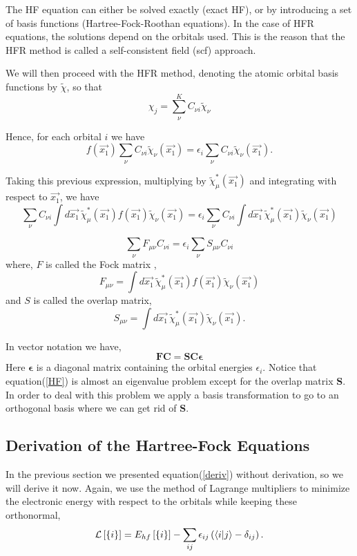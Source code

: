 \documentclass[a4paper]{article}
\begin{document}
The HF equation can either be solved exactly (exact HF), or by introducing a set of basis functions (Hartree-Fock-Roothan equations).
In the case of HFR equations, the solutions depend on the orbitals used.
This is the reason that the HFR method is called a self-consistent field (scf) approach.

We will then proceed with the HFR method, denoting the atomic orbital basis functions by $\tilde{\chi}$, so that
$$
\chi_{j} = \sum^{K}_{\nu} C_{\nu i} \tilde{\chi}_{\nu}
$$

Hence, for each orbital $i$ we have
$$
f(\vec{x_1}) \sum_{\nu} C_{\nu i} \tilde{\chi}_{\nu}(\vec{x_1}) = \epsilon_i \sum_{\nu} C_{\nu i} \tilde{\chi}_{\nu}(\vec{x_1}).
$$

Taking this previous expression, multiplying by $\tilde{\chi}^{*}_{\mu} (\vec{x_1})$ and integrating with respect to $\vec{x_1}$, we have
$$
\sum_\nu C_{\nu i} \int d\vec{x_1} \, \tilde{\chi}^{*}_{\mu}(\vec{x_1}) f(\vec{x_1}) \tilde{\chi}_{\nu}(\vec{x_1}) =
\epsilon_i \sum_\nu C_{\nu i} \int d\vec{x_1} \, \tilde{\chi}^{*}_{\mu}(\vec{x_1}) \tilde{\chi}_{\nu}(\vec{x_1})
$$

$$
\sum_\nu F_{\mu\nu} C_{\nu i} = \epsilon_i \sum_\nu S_{\mu\nu} C_{\nu i}
$$
where, $F$ is called the Fock matrix ,
$$
 F_{\mu\nu} = \int d\vec{x_1} \, \tilde{\chi}^{*}_{\mu}(\vec{x_1}) f(\vec{x_1}) \tilde{\chi}_{\nu}(\vec{x_1})
$$
and $S$ is called the overlap matrix,
$$
S_{\mu\nu} = \int d\vec{x_1} \, \tilde{\chi}^{*}_{\mu}(\vec{x_1}) \tilde{\chi}_{\nu}(\vec{x_1}).
$$

In vector notation we have,
\begin{equation} \label{HF}
\boldsymbol{FC} = \boldsymbol{SC\epsilon}
\end{equation}
Here $\boldsymbol{\epsilon}$ is a diagonal matrix containing the orbital energies $\epsilon_i$.
Notice that equation(\ref{HF}) is almost an eigenvalue problem except for the overlap matrix \textbf{S}.
In order to deal with this problem we apply a basis transformation to go to an orthogonal basis where we can get rid of \textbf{S}.


\subsection{Derivation of the Hartree-Fock Equations}
In the previous section we presented equation(\ref{deriv}) without derivation, so we will derive it now.
Again, we use the method of Lagrange multipliers to minimize the electronic energy with respect to the orbitals while keeping these orthonormal,
$$
\mathcal{L} \left[ \{ i \}\right] =  E_{hf} \left[\{i\}\right] - \sum_{ij} \epsilon_{ij} \left(\braket{i | j} - \delta_{ij} \right).
$$
\end{document}

